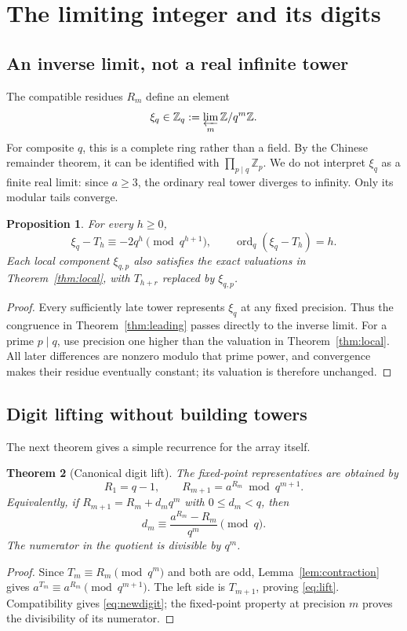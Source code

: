 \documentclass[11pt,a4paper]{article}
\numberwithin{equation}{section}
\theoremstyle{plain}
\newtheorem{theorem}{Theorem}[section]
\newtheorem{proposition}[theorem]{Proposition}
\theoremstyle{definition}
\newcommand{\Z}{\mathbb Z}
\newcommand{\ordq}{\operatorname{ord}_q}
\begin{document}
\section{The limiting integer and its digits}\label{sec:limit}

\subsection{An inverse limit, not a real infinite tower}
The compatible residues $R_m$ define an element
\[
 \xi_q\in\Z_q:=\varprojlim_m\Z/q^m\Z.
\]
For composite $q$, this is a complete ring rather than a field.
By the Chinese remainder theorem, it can be identified with
$\prod_{p\mid q}\Z_p$.  We do not interpret $\xi_q$ as a finite real
limit: since $a\ge3$, the ordinary real tower diverges to infinity.
Only its modular tails converge.

\begin{proposition}\label{prop:limit-error}
For every $h\ge0$,
\begin{equation}\label{eq:limit-leading}
 \xi_q-T_h\equiv-2q^h\pmod{q^{h+1}},
 \qquad \ordq(\xi_q-T_h)=h.
\end{equation}
Each local component $\xi_{q,p}$ also satisfies the exact valuations
in Theorem~\ref{thm:local}, with $T_{h+r}$ replaced by $\xi_{q,p}$.
\end{proposition}
\begin{proof}
Every sufficiently late tower represents $\xi_q$ at any fixed
precision.  Thus the congruence in Theorem~\ref{thm:leading} passes directly
to the inverse limit.  For a prime $p\mid q$, use precision one higher
than the valuation in Theorem~\ref{thm:local}.  All later differences are
nonzero modulo that prime power, and convergence makes their residue
eventually constant; its valuation is therefore unchanged.
\end{proof}

\subsection{Digit lifting without building towers}
The next theorem gives a simple recurrence for the array itself.

\begin{theorem}[Canonical digit lift]\label{thm:lift}
The fixed-point representatives are obtained by
\begin{equation}\label{eq:lift}
 R_1=q-1,\qquad R_{m+1}=a^{R_m}\bmod q^{m+1}.
\end{equation}
Equivalently, if $R_{m+1}=R_m+d_mq^m$ with $0\le d_m<q$, then
\begin{equation}\label{eq:newdigit}
 d_m\equiv\frac{a^{R_m}-R_m}{q^m}\pmod q.
\end{equation}
The numerator in the quotient is divisible by $q^m$.
\end{theorem}
\begin{proof}
Since $T_m\equiv R_m\pmod{q^m}$ and both are odd,
Lemma~\ref{lem:contraction} gives
$a^{T_m}\equiv a^{R_m}\pmod{q^{m+1}}$.
The left side is $T_{m+1}$, proving \eqref{eq:lift}.
Compatibility gives \eqref{eq:newdigit}; the fixed-point property at
precision $m$ proves the divisibility of its numerator.
\end{proof}
\end{document}
